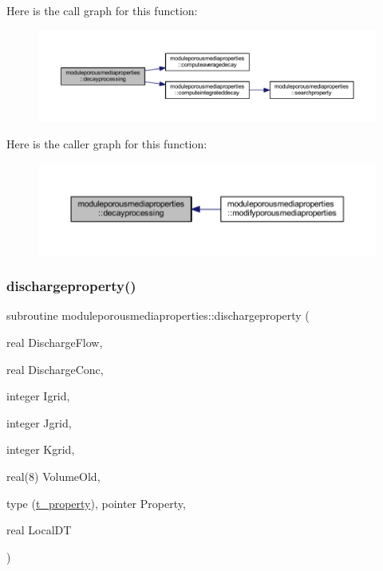 Here is the call graph for this function\+:\nopagebreak
\begin{figure}[H]
\begin{center}
\leavevmode
\includegraphics[width=350pt]{namespacemoduleporousmediaproperties_a9e33074d02a745b0e8cd90eccef5b5ed_cgraph}
\end{center}
\end{figure}
Here is the caller graph for this function\+:\nopagebreak
\begin{figure}[H]
\begin{center}
\leavevmode
\includegraphics[width=350pt]{namespacemoduleporousmediaproperties_a9e33074d02a745b0e8cd90eccef5b5ed_icgraph}
\end{center}
\end{figure}
\mbox{\label{namespacemoduleporousmediaproperties_a0e66cb3f0270a54dfa87774f558ac3d5}} 
\subsubsection{\texorpdfstring{dischargeproperty()}{dischargeproperty()}}
{\footnotesize\ttfamily subroutine moduleporousmediaproperties\+::dischargeproperty (\begin{DoxyParamCaption}\item[{real}]{Discharge\+Flow,  }\item[{real}]{Discharge\+Conc,  }\item[{integer}]{Igrid,  }\item[{integer}]{Jgrid,  }\item[{integer}]{Kgrid,  }\item[{real(8)}]{Volume\+Old,  }\item[{type (\mbox{\hyperlink{structmoduleporousmediaproperties_1_1t__property}{t\+\_\+property}}), pointer}]{Property,  }\item[{real}]{Local\+DT }\end{DoxyParamCaption})\hspace{0.3cm}{\ttfamily [private]}}

